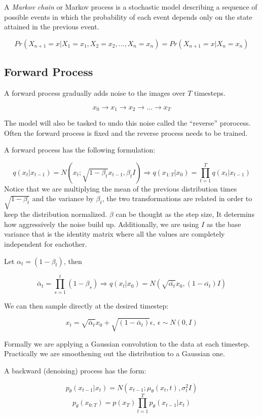 \documentclass[11pt]{article}
\begin{document}
A \emph{Markov chain} or Markov process is a stochastic model describing
a sequence of possible events in which the probability of each event
depends only on the state attained in the previous event.

\[Pr(X_{n+1}=x|X_1=x_1, X_2 = x_2, ..., X_n = x_n)=Pr(X_{n+1}=x|X_{n}=x_n)\]

\subsection{Forward Process}\label{forward-process}

A forward process gradually adds noise to the images over \(T\)
timesteps.

\[x_0\rightarrow x_1 \rightarrow x_2 \rightarrow ... \rightarrow x_T\]

The model will also be tasked to undo this noise called the ``reverse''
prorocess. Often the forward process is fixed and the reverse process
needs to be trained.

A forward process has the following formulation:

\[q(x_t|x_{t-1})=N(x_t; \sqrt{1-\beta_t}x_{t-1},\beta_t I)\Rightarrow q(x_{1:T}|x_0)=\prod_{t=1}^Tq(x_t|x_{t-1})\]
Notice that we are multiplying the mean of the previous distribution
times \(\sqrt{1-\beta_t}\) and the variance by \(\beta_t\), the two
transformations are related in order to keep the distribution
normalized. \(\beta\) can be thought as the step size, It determins how
aggressively the noise build up. Additionally, we are using \(I\) as the
base variance that is the identity matrix where all the values are
completely independent for eachother.

Let \(\alpha_t = (1-\beta_t)\), then

\[\bar{\alpha}_t=\prod_{s=1}^t(1-\beta_s)\Rightarrow q(x_t|x_0)=N(\sqrt{\bar{\alpha_t}}x_0, (1-\bar{\alpha_t})I)\]

We can then sample directly at the desired timestep:

\[x_t=\sqrt{\bar{\alpha}_t}x_0 + \sqrt{(1-\bar{\alpha}_t)}\epsilon,\ \epsilon \sim N(0, I)\]

Formally we are applying a Gaussian convolution to the data at each
timestep. Practically we are smoothening out the distribution to a
Gaussian one.

A backward (denoising) process has the form:

\[p_\theta (x_{t-1}|x_t)=N(x_{t-1};\mu_\theta (x_t, t), \sigma_t^2I)\]
\[p_\theta (x_{0:T})=p(x_T)\prod_{t=1}^Tp_\theta (x_{t-1}|x_t)\]
\end{document}
